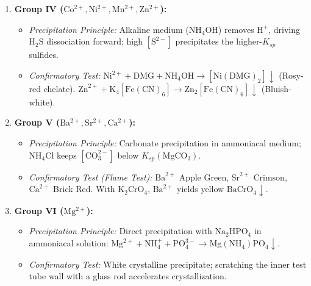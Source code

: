 \documentclass[10pt,twoside,openright]{book}
\begin{document}
\begin{conceptbox}
\begin{enumerate}[leftmargin=*]
\begin{itemize}
    \item \textit{Confirmatory Test:} $\mathrm{Fe^{3+}} + \mathrm{K_4[Fe(CN)_6]} \to \mathrm{Fe_4[Fe(CN)_6]_3}\downarrow$ (Prussian Blue). $\mathrm{Al(OH)_3}$ dissolves in excess $\mathrm{NaOH}$ to form soluble $\mathrm{NaAlO_2}$, reprecipitated with $\mathrm{NH_4Cl}$.
  \end{itemize}
  \item \textbf{Group IV ($\mathrm{Co^{2+}, Ni^{2+}, Mn^{2+}, Zn^{2+}}$):}
  \begin{itemize}
    \item \textit{Precipitation Principle:} Alkaline medium ($\mathrm{NH_4OH}$) removes $\mathrm{H}^+$, driving $\mathrm{H_2S}$ dissociation forward; high $[\mathrm{S}^{2-}]$ precipitates the higher-$K_{sp}$ sulfides.
    \item \textit{Confirmatory Test:} $\mathrm{Ni^{2+}} + \mathrm{DMG} + \mathrm{NH_4OH} \to [\mathrm{Ni(DMG)_2}]\downarrow$ (Rosy-red chelate). $\mathrm{Zn}^{2+} + \mathrm{K_4[Fe(CN)_6]} \to \mathrm{Zn_2[Fe(CN)_6]}\downarrow$ (Bluish-white).
  \end{itemize}
  \item \textbf{Group V ($\mathrm{Ba^{2+}, Sr^{2+}, Ca^{2+}}$):}
  \begin{itemize}
    \item \textit{Precipitation Principle:} Carbonate precipitation in ammoniacal medium; $\mathrm{NH_4Cl}$ keeps $[\mathrm{CO_3^{2-}}]$ below $K_{sp}(\mathrm{MgCO_3})$.
    \item \textit{Confirmatory Test (Flame Test):} $\mathrm{Ba}^{2+}$ Apple Green, $\mathrm{Sr}^{2+}$ Crimson, $\mathrm{Ca}^{2+}$ Brick Red. With $\mathrm{K_2CrO_4}$, $\mathrm{Ba}^{2+}$ yields yellow $\mathrm{BaCrO_4}\downarrow$.
  \end{itemize}
  \item \textbf{Group VI ($\mathrm{Mg^{2+}}$):}
  \begin{itemize}
    \item \textit{Precipitation Principle:} Direct precipitation with $\mathrm{Na_2HPO_4}$ in ammoniacal solution: $\mathrm{Mg}^{2+} + \mathrm{NH_4^+} + \mathrm{PO_4^{3-}} \to \mathrm{Mg(NH_4)PO_4}\downarrow$.
    \item \textit{Confirmatory Test:} White crystalline precipitate; scratching the inner test tube wall with a glass rod accelerates crystallization.
  \end{itemize}
\end{enumerate}
\end{conceptbox}
\end{document}
